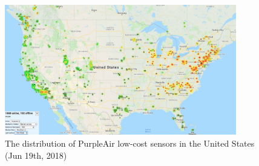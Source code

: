 \documentclass[11pt]{article}
\begin{document}
\begin{figure}[H]
    \centering
    \includegraphics[width=0.9\textwidth]{img/purpleair.jpg}
    \caption{The distribution of PurpleAir low-cost sensors in the United States (Jun 19th, 2018)}
    \label{fig:pa}
\end{figure}

\newpage


\end{document}
